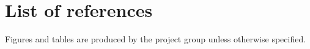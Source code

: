 \chapter{List of references}  \label{ch:reflist}
	Figures and tables are produced by the project group unless otherwise specified.
\begingroup  
  \let\chapter\section 
  \makeatletter\let\markboth\@firstoftwo\makeatother 
  \pagestyle{plain}
  \listoffigures 
  \listoftables
	
   \begin{flushleft}
    
   \end{flushleft} 
  \pagestyle{fancy}
\endgroup